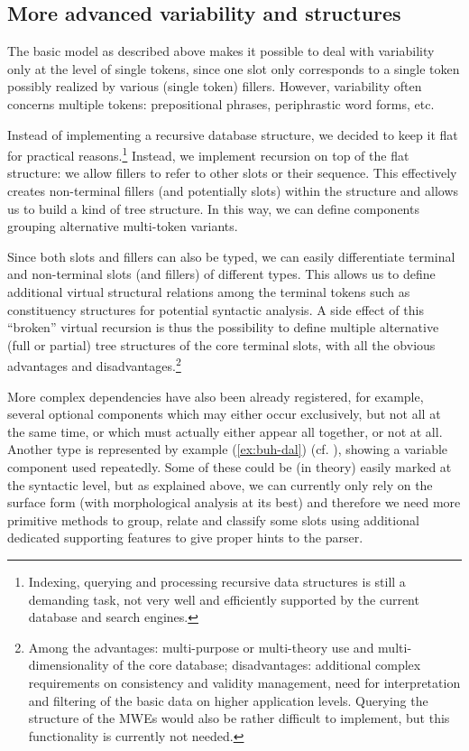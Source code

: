 \documentclass[output=paper,colorlinks,citecolor=brown]{langscibook}
\begin{document}
\subsection{More advanced variability and structures}\label{sec:db:adv-variability}\largerpage[-1]

The basic model as described above makes it possible to deal with variability only at the level of single tokens, since one slot only corresponds to a single token possibly realized by various (single token) fillers. However, variability often concerns multiple tokens: prepositional phrases, periphrastic word forms, etc.

Instead of implementing a recursive database structure, we decided to keep it flat for practical reasons.\footnote{Indexing, querying and processing recursive data structures is still a demanding task, not very well and efficiently supported by the current database and search engines.} Instead, we implement recursion on top of the flat structure: we allow fillers to refer to other slots or their sequence. This effectively creates non-terminal fillers (and potentially slots) within the structure and allows us to build a kind of tree structure. In this way, we can define components grouping alternative multi-token variants.

Since both slots and fillers can also be typed, we can easily differentiate terminal and non-terminal slots (and fillers) of different types. This allows us to define additional virtual structural relations among the terminal tokens such as constituency structures for potential syntactic analysis. A side effect of this ``broken'' virtual recursion is thus the possibility to define multiple alternative (full or partial) tree structures of the core terminal slots, with all the obvious advantages and disadvantages.\footnote{Among the advantages: multi-purpose or multi-theory use and multi-dimensionality of the core database; disadvantages: additional complex requirements on consistency and validity management, need for interpretation and filtering of the basic data on higher application levels. 
Querying the structure of the MWEs would also be rather difficult to implement, but this functionality is currently not needed.}

More complex dependencies have also been already registered, for example, several optional components which may either occur exclusively, but not all at the same time, or which must actually either appear all together, or not at all. Another type is represented by example (\ref{ex:buh-dal}) (cf. ), showing a variable component used repeatedly. Some of these could be (in theory) easily marked at the syntactic level, but as explained above, we can currently only rely on the surface form (with morphological analysis at its best) and therefore we need more primitive methods to group, relate and classify some slots using additional dedicated supporting features to give proper hints to the parser.
\end{document}
